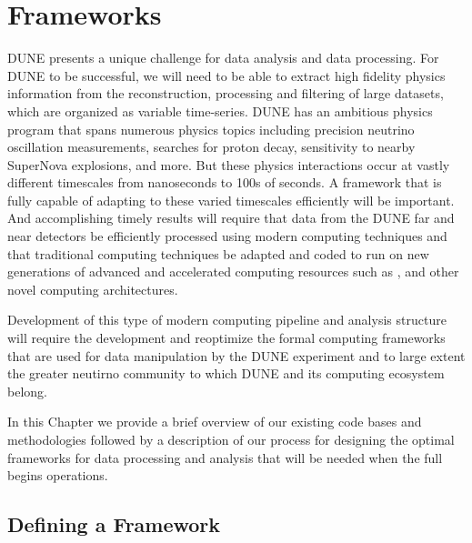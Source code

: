 \documentclass[../main-v1.tex]{subfiles}
\begin{document}
\chapter{Frameworks}\label{ch:fworks}

DUNE presents a unique challenge for data analysis and data processing. For DUNE to be successful, we will need to be able to extract high fidelity physics information from the reconstruction, processing and filtering of large datasets, which are organized as variable time-series.   DUNE has an ambitious physics program that spans numerous physics topics including precision neutrino oscillation measurements, searches for proton decay, sensitivity to nearby SuperNova explosions, and more. But these physics interactions occur at vastly different timescales from nanoseconds to 100s of seconds. A framework that is fully capable of adapting to these varied timescales efficiently will be important. And accomplishing timely results will require that data from the DUNE far and near detectors  be efficiently processed using modern computing techniques and that traditional  computing techniques be adapted and coded to run on new generations of advanced and accelerated computing resources such as ,  and other novel computing architectures.  

Development of this type of modern computing pipeline and analysis structure will require the development and reoptimize the formal computing frameworks that are used for data manipulation by the DUNE experiment and to large extent the greater neutirno community to which DUNE and its computing ecosystem belong.

In this Chapter we provide a brief overview of our existing code bases and methodologies followed by a description of our process for designing the optimal frameworks for data processing and analysis that will be needed when the full  begins operations.  

\section{Defining a Framework}\label{sec:framework:def}
\end{document}
